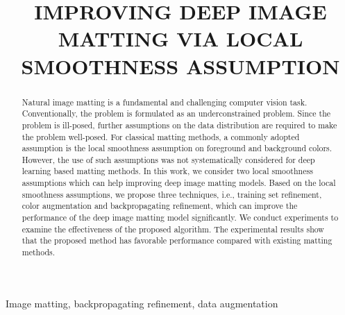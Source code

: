 \documentclass{article}
\theoremstyle{plain}
\begin{document}
\sloppy






\title{IMPROVING DEEP IMAGE MATTING VIA LOCAL SMOOTHNESS ASSUMPTION}
\address{
$^1$Center for Applied Statistics and School of Statistics,
\\
Renmin University of China,
Beijing 100872, China
\\
$^2$PCIE Lab, Lenovo Research, Beijing, China
\\
$^3$School of Optics and Photonics, Beijing Institute of Technology, Beijing, China
\\
$^4$Department of Physics, and Fujian Provincial Key Laboratory for Soft Functional Materials Research,
\\
Xiamen University,
Xiamen 361005, China
}


\maketitle


\begin{abstract}
    Natural image matting is a fundamental and challenging computer vision task. Conventionally, the problem is formulated as an underconstrained problem. Since the problem is ill-posed, further assumptions on the data distribution are required to make the problem well-posed. For classical matting methods, a commonly adopted assumption is the local smoothness assumption on foreground and background colors. However, the use of such assumptions was not systematically considered for deep learning based matting methods. In this work, we consider two local smoothness assumptions which can help improving deep image matting models. Based on the local smoothness assumptions, we propose three techniques, i.e., training set refinement, color augmentation and backpropagating refinement, which can improve the performance of the deep image matting model significantly. We conduct experiments to examine the effectiveness of the proposed algorithm. The experimental results show that the proposed  method has favorable performance compared with existing matting methods.
\end{abstract}
\begin{keywords}
    Image matting, backpropagating refinement, data augmentation
\end{keywords}
\end{document}
